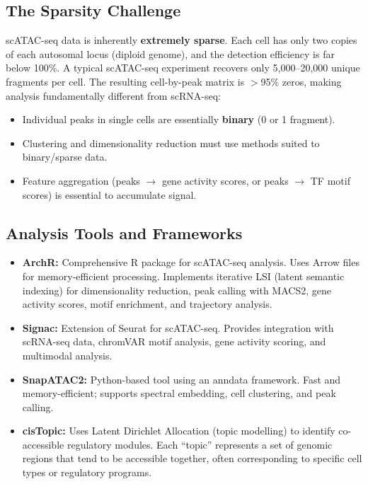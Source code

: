 \subsection{The Sparsity Challenge}
\label{subsec:chromatin:scatac-sparsity}

scATAC-seq data is inherently \textbf{extremely sparse}. Each cell has only two copies of each autosomal locus (diploid genome), and the detection efficiency is far below 100\%. A typical scATAC-seq experiment recovers only 5,000--20,000 unique fragments per cell. The resulting cell-by-peak matrix is $>$95\% zeros, making analysis fundamentally different from scRNA-seq:

\begin{itemize}[itemsep=2pt]
  \item Individual peaks in single cells are essentially \textbf{binary} (0 or 1 fragment).
  \item Clustering and dimensionality reduction must use methods suited to binary/sparse data.
  \item Feature aggregation (peaks $\rightarrow$ gene activity scores, or peaks $\rightarrow$ TF motif scores) is essential to accumulate signal.
\end{itemize}

\subsection{Analysis Tools and Frameworks}
\label{subsec:chromatin:scatac-tools}

\begin{itemize}[itemsep=3pt]
  \item \textbf{ArchR:} Comprehensive R package for scATAC-seq analysis. Uses Arrow files for memory-efficient processing. Implements iterative LSI (latent semantic indexing) for dimensionality reduction, peak calling with MACS2, gene activity scores, motif enrichment, and trajectory analysis.
  \item \textbf{Signac:} Extension of Seurat for scATAC-seq. Provides integration with scRNA-seq data, chromVAR motif analysis, gene activity scoring, and multimodal analysis.
  \item \textbf{SnapATAC2:} Python-based tool using an anndata framework. Fast and memory-efficient; supports spectral embedding, cell clustering, and peak calling.
  \item \textbf{cisTopic:} Uses Latent Dirichlet Allocation (topic modelling) to identify co-accessible regulatory modules. Each ``topic'' represents a set of genomic regions that tend to be accessible together, often corresponding to specific cell types or regulatory programs.
\end{itemize}

